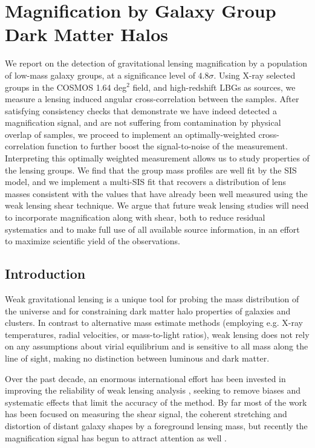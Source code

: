
\chapter{Magnification by Galaxy Group Dark Matter Halos}
\label{ch2}

We report on the detection of gravitational lensing magnification by a population of low-mass galaxy groups, at a significance level of $4.8 \sigma$.  Using X-ray selected groups in the \acf{COSMOS} 1.64 deg$^2$ field, and high-redshift \ac{LBG}s as sources, we measure a lensing induced angular cross-correlation between the samples.  After satisfying consistency checks that demonstrate we have indeed detected a magnification signal, and are not suffering from contamination by physical overlap of samples, we proceed to implement an optimally-weighted cross-correlation function to further boost the signal-to-noise of the measurement. Interpreting this optimally weighted measurement allows us to study properties of the lensing groups.  We find that the group mass profiles are well fit by the \acf{SIS} model, and we implement a multi-\ac{SIS} fit that recovers a distribution of lens masses consistent with the values that have already been well measured using the weak lensing shear technique.  We argue that future weak lensing studies will need to incorporate magnification along with shear, both to reduce residual systematics and to make full use of all available source information, in an effort to maximize scientific yield of the observations.


\section{Introduction}
Weak gravitational lensing is a unique tool for probing the mass distribution of the universe and for constraining dark matter halo properties of galaxies and clusters.  In contrast to alternative mass estimate methods (employing e.g. X-ray temperatures, radial velocities, or mass-to-light ratios), weak lensing does not rely on any assumptions about virial equilibrium and is sensitive to all mass along the line of sight, making no distinction between luminous and dark matter.  

Over the past decade, an enormous international effort has been invested in improving the reliability of weak lensing analysis \citep{step1, step2, great08, great10}, seeking to remove biases and systematic effects that limit the accuracy of the method.  By far most of the work has been focused on measuring the shear signal, the coherent stretching and distortion of distant galaxy shapes by a foreground lensing mass, but recently the magnification signal has begun to attract attention as well \citep{Scranton05, Hildebrandt09b, Hildebrandt11, LHJM10, Umetsu11}.  

